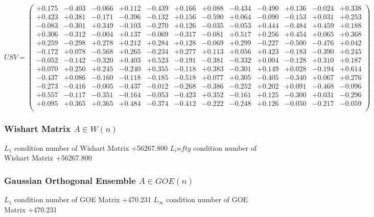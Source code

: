 \documentclass[9pt]{article}
\theoremstyle{plain}
\theoremstyle{definition}
\theoremstyle{remark}
\numberwithin{equation}{section}
\begin{document}
$U S V = \left(
\begin{array}{
cccccccccccc}
+0.175 & -0.403 & -0.066 & +0.112 & -0.439 & +0.166 & +0.088 & -0.434 & -0.490 & +0.136 & -0.024 & +0.338 \\
+0.423 & +0.381 & -0.171 & -0.396 & -0.132 & +0.156 & -0.590 & +0.064 & -0.090 & -0.153 & +0.031 & +0.253 \\
-0.083 & -0.301 & +0.349 & -0.103 & -0.270 & +0.126 & -0.035 & -0.053 & +0.444 & -0.484 & +0.459 & +0.188 \\
+0.306 & -0.312 & -0.004 & +0.137 & -0.069 & -0.317 & -0.081 & +0.517 & +0.256 & +0.454 & +0.065 & +0.368 \\
+0.259 & -0.298 & +0.278 & +0.212 & +0.284 & +0.128 & -0.069 & +0.299 & -0.227 & -0.500 & -0.476 & +0.042 \\
-0.172 & +0.078 & -0.568 & +0.265 & -0.234 & +0.277 & +0.113 & +0.056 & +0.423 & -0.183 & -0.390 & +0.245 \\
-0.052 & -0.142 & -0.320 & +0.403 & +0.523 & -0.191 & -0.381 & -0.332 & +0.004 & -0.128 & +0.310 & +0.187 \\
+0.070 & +0.250 & +0.245 & -0.240 & +0.355 & -0.118 & +0.383 & -0.301 & +0.149 & +0.028 & -0.194 & +0.614 \\
-0.437 & +0.086 & -0.160 & -0.118 & -0.185 & -0.518 & +0.077 & +0.305 & -0.405 & -0.340 & +0.067 & +0.276 \\
-0.273 & -0.416 & -0.005 & -0.437 & -0.012 & -0.268 & -0.386 & -0.252 & +0.202 & +0.091 & -0.468 & -0.096 \\
+0.557 & -0.117 & -0.351 & -0.164 & -0.053 & -0.423 & +0.352 & -0.161 & +0.125 & -0.300 & +0.031 & -0.296 \\
+0.095 & +0.365 & +0.365 & +0.484 & -0.374 & -0.412 & -0.222 & -0.248 & +0.126 & -0.050 & -0.217 & -0.059 \\
\end{array}
\right)$ \newline 

\subsubsection{Wishart Matrix $A \in W(n)$}
$L_1$ condition number of Wishart Matrix +56267.800
$L_infty$ condition number of Wishart Matrix +56267.800
\subsubsection{Gaussian Orthogonal Ensemble $A \in GOE(n)$}
$L_1$ condition number of GOE Matrix +470.231
$L_\infty$ condition number of GOE Matrix +470.231
\end{document}
